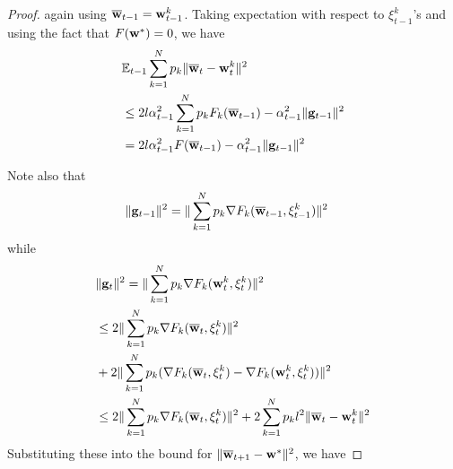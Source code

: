 \begin{proof}
\begin{comment}
	\end{cases}
	\end{align*}
	\begin{align*}
	\sum_{k=1}^{N}p_{k}\|\ov{w}_{t}-\vw_{t}^{k}\|^{2} & =\sum_{k=1}^{N}p_{k}\|\ov{w}_{t-1}-\alpha_{t-1}\vg_{t-1}+\beta_{t-1}(\ov{v}_{t}-\ov{v}_{t-1})-\ov{w}_{t-1}+\alpha_{t-1}\vg_{t-1,k}-\beta_{t-1}(v_{t}-\ov{v}_{t-1})\|^{2}\\
	& =\sum_{k=1}^{N}p_{k}\|-\alpha_{t-1}\vg_{t-1}+\alpha_{t-1}\vg_{t-1,k}+\beta_{t-1}(\ov{v}_{t}-v_{t})\|^{2}\\
	& =\sum_{k=1}^{N}p_{k}\|-\alpha_{t-1}\vg_{t-1}+\alpha_{t-1}\vg_{t-1,k}+\beta_{t-1}(\ov{w}_{t-1}-\alpha_{t-1}\vg_{t-1}-\ov{w}_{t-1}-\alpha_{t-1}\vg_{t-1,k})\|^{2}\\
	& =\alpha_{t-1}^{2}(1+\beta_{t-1})^{2}\sum_{k=1}^{N}p_{k}\|\vg_{t-1}-\vg_{t-1,k}\|^{2}
	\end{align*}
	\end{comment}
	again using ${\overline{\mathbf{w}}}_{t-1}={\mathbf{w}}_{t-1}^{k}$. Taking expectation
	with respect to $\xi_{t-1}^{k}$'s and using the fact that $F({\mathbf{w}}^{\ast})=0$,
	we have 
	\begin{align*}
	&\mathbb{E}_{t-1}\sum_{k=1}^{N}p_{k}\|{\overline{\mathbf{w}}}_{t}-{\mathbf{w}}_{t}^{k}\|^{2} \\
	& \leq2l\alpha_{t-1}^{2}\sum_{k=1}^{N}p_{k}F_{k}({\overline{\mathbf{w}}}_{t-1})-\alpha_{t-1}^{2}\|{\mathbf{g}}_{t-1}\|^{2}\\
	& =2l\alpha_{t-1}^{2}F({\overline{\mathbf{w}}}_{t-1})-\alpha_{t-1}^{2}\|{\mathbf{g}}_{t-1}\|^{2}
	\end{align*}
	
	Note also that 
	\begin{align*}
	\|{\mathbf{g}}_{t-1}\|^{2} & =\|\sum_{k=1}^{N}p_{k}\nabla F_{k}({\overline{\mathbf{w}}}_{t-1},\xi_{t-1}^{k})\|^{2}
	\end{align*}
	while
	\begin{align*}
	&\|{\mathbf{g}}_{t}\|^{2}=\|\sum_{k=1}^{N}p_{k}\nabla F_{k}({\mathbf{w}}_{t}^{k},\xi_{t}^{k})\|^{2} \\
	& \leq2\|\sum_{k=1}^{N}p_{k}\nabla F_{k}({\overline{\mathbf{w}}}_{t},\xi_{t}^{k})\|^{2}\\
	& +2\|\sum_{k=1}^{N}p_{k}(\nabla F_{k}({\overline{\mathbf{w}}}_{t},\xi_{t}^{k})-\nabla F_{k}({\mathbf{w}}_{t}^{k},\xi_{t}^{k}))\|^{2}\\
	& \leq2\|\sum_{k=1}^{N}p_{k}\nabla F_{k}({\overline{\mathbf{w}}}_{t},\xi_{t}^{k})\|^{2}+2\sum_{k=1}^{N}p_{k}l^{2}\|{\overline{\mathbf{w}}}_{t}-{\mathbf{w}}_{t}^{k}\|^{2}
	\end{align*}
	Substituting these into the bound for $\|{\overline{\mathbf{w}}}_{t+1}-{\mathbf{w}}^{\ast}\|^{2}$,
	we have 
	

\end{proof}
